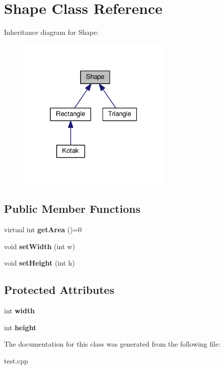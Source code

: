 \hypertarget{classShape}{}\section{Shape Class Reference}
\label{classShape}


Inheritance diagram for Shape\+:
\nopagebreak
\begin{figure}[H]
\begin{center}
\leavevmode
\includegraphics[width=210pt]{classShape__inherit__graph}
\end{center}
\end{figure}
\subsection*{Public Member Functions}
\begin{DoxyCompactItemize}
\item 
\mbox{\label{classShape_a04eb100a2d610e742f9f60f88e18fa12}} 
virtual int {\bfseries get\+Area} ()=0
\item 
\mbox{\label{classShape_a8b870509c90bc2523d1ee4e2d7335b7a}} 
void {\bfseries set\+Width} (int w)
\item 
\mbox{\label{classShape_a25bae3a4a703908f98b50ebd951dfdc1}} 
void {\bfseries set\+Height} (int h)
\end{DoxyCompactItemize}
\subsection*{Protected Attributes}
\begin{DoxyCompactItemize}
\item 
\mbox{\label{classShape_a878c5f855a51e9481ec55b9f572c2864}} 
int {\bfseries width}
\item 
\mbox{\label{classShape_a0fec724e7567c0cb042869b487c747da}} 
int {\bfseries height}
\end{DoxyCompactItemize}


The documentation for this class was generated from the following file\+:\begin{DoxyCompactItemize}
\item 
test.\+cpp\end{DoxyCompactItemize}
